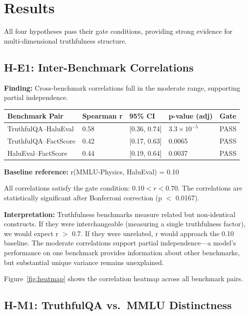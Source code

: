 \section{Results}
\label{sec:results}

All four hypotheses pass their gate conditions, providing strong evidence for multi-dimensional truthfulness structure.

\subsection{H-E1: Inter-Benchmark Correlations}

\textbf{Finding:} Cross-benchmark correlations fall in the moderate range, supporting partial independence.

\begin{table}[h]
\centering
\begin{tabular}{@{}lllll@{}}
\toprule
\textbf{Benchmark Pair} & \textbf{Spearman r} & \textbf{95\% CI} & \textbf{p-value (adj)} & \textbf{Gate} \\
\midrule
TruthfulQA--HaluEval & 0.58 & [0.36, 0.74] & $3.3\times10^{-5}$ & PASS \\
TruthfulQA--FactScore & 0.42 & [0.17, 0.63] & 0.0065 & PASS \\
HaluEval--FactScore & 0.44 & [0.19, 0.64] & 0.0037 & PASS \\
\bottomrule
\end{tabular}
\end{table}

\textbf{Baseline reference:} r(MMLU-Physics, HaluEval) = 0.10

All correlations satisfy the gate condition: $0.10 < r < 0.70$. The correlations are statistically significant after Bonferroni correction (p $<$ 0.0167).

\textbf{Interpretation:} Truthfulness benchmarks measure related but non-identical constructs. If they were interchangeable (measuring a single truthfulness factor), we would expect r $>$ 0.7. If they were unrelated, r would approach the 0.10 baseline. The moderate correlations support partial independence---a model's performance on one benchmark provides information about other benchmarks, but substantial unique variance remains unexplained.

Figure~\ref{fig:heatmap} shows the correlation heatmap across all benchmark pairs.

\subsection{H-M1: TruthfulQA vs.\ MMLU Distinctness}

